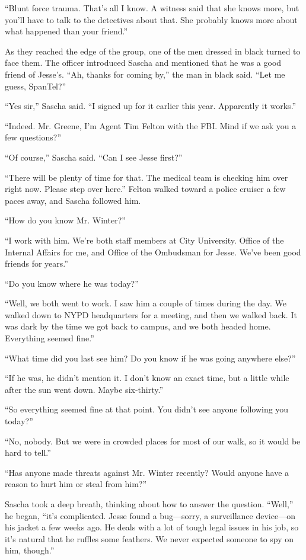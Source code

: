 \documentclass[12pt]{book}
\begin{document}
``Blunt force trauma.  That's all I know.  A witness said that she knows more, but you'll have to talk to the detectives about that.  She probably knows more about what happened than your friend.''

As they reached the edge of the group, one of the men dressed in black turned to face them.  The officer introduced Sascha and mentioned that he was a good friend of Jesse's.  ``Ah, thanks for coming by,'' the man in black said.  ``Let me guess, SpanTel?''

``Yes sir,'' Sascha said.  ``I signed up for it earlier this year.  Apparently it works.''

``Indeed.  Mr. Greene, I'm Agent Tim Felton with the FBI.  Mind if we ask you a few questions?''

``Of course,'' Sascha said.  ``Can I see Jesse first?''

``There will be plenty of time for that.  The medical team is checking him over right now.  Please step over here.''  Felton walked toward a police cruiser a few paces away, and Sascha followed him.

``How do you know Mr. Winter?''

``I work with him.  We're both staff members at City University.  Office of the Internal Affairs for me, and Office of the Ombudsman for Jesse.  We've been good friends for years.''

``Do you know where he was today?''

``Well, we both went to work.  I saw him a couple of times during the day.  We walked down to NYPD headquarters for a meeting, and then we walked back.  It was dark by the time we got back to campus, and we both headed home.  Everything seemed fine.''

``What time did you last see him?  Do you know if he was going anywhere else?''

``If he was, he didn't mention it.  I don't know an exact time, but a little while after the sun went down.  Maybe six-thirty.''

``So everything seemed fine at that point.  You didn't see anyone following you today?''

``No, nobody.  But we were in crowded places for most of our walk, so it would be hard to tell.''

``Has anyone made threats against Mr. Winter recently?  Would anyone have a reason to hurt him or steal from him?''

Sascha took a deep breath, thinking about how to answer the question.  ``Well,'' he began, ``it's complicated.  Jesse found a bug---sorry, a surveillance device---on his jacket a few weeks ago.  He deals with a lot of tough legal issues in his job, so it's natural that he ruffles some feathers.  We never expected someone to spy on him, though.''
\end{document}
